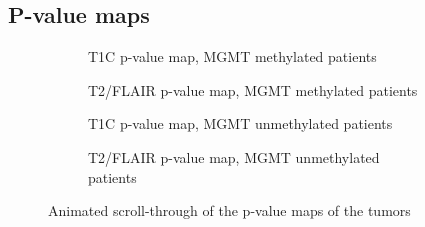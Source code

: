 \begin{subappendices}
    \section{P-value maps}
    \begin{figure}[H]
        \centering
        \begin{subfigure}[t]{0.4\textwidth}
            \centering
            \caption{\acrshort{T1C} p-value map, \acrshort{MGMT} methylated patients}\label{fig:HGG_loc_T1_p_value_map_methylated}
        \end{subfigure}
        \hfill
        \begin{subfigure}[t]{0.4\textwidth}
            \centering
            \caption{\acrshort{T2}/\acrshort{FLAIR} p-value map, \acrshort{MGMT} methylated patients}\label{fig:HGG_loc_T2_p_value_map_methylated}
        \end{subfigure}

        \begin{subfigure}[t]{0.4\textwidth}
            \centering
            \caption{\acrshort{T1C} p-value map, \acrshort{MGMT} unmethylated patients}\label{fig:HGG_loc_T1_p_value_map_unmethylated}
        \end{subfigure}
        \hfill
        \begin{subfigure}[t]{0.4\textwidth}
            \centering
            \caption{\acrshort{T2}/\acrshort{FLAIR} p-value map, \acrshort{MGMT} unmethylated patients}\label{fig:HGG_loc_T2_p_value_map_unmethylated}
        \end{subfigure}
        \caption{Animated scroll-through of the p-value maps of the \glspl{tumor}}\label{fig:HGG_loc_p_value_map_full}
    \end{figure}
\end{subappendices}

